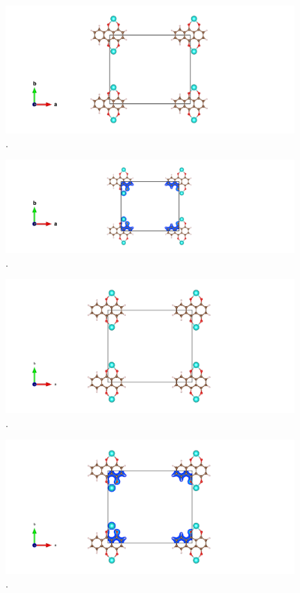 \documentclass{article}
\begin{document}
  \begin{figure}[H]
      \centering
      \includegraphics[width = 11cm]{../fig/Yb_relax_CONTCAR.png}
      \caption{. }
      \label{fig:Yb_relax_CONTCAR}
  \end{figure}

  \begin{figure}[H]
      \centering
      \includegraphics[width = 11cm]{../fig/Yb_relax_CHGCAR.png}
      \caption{. }
      \label{fig:Yb_relax_CHGCAR}
  \end{figure}

  \begin{figure}[H]
      \centering
      \includegraphics[width = 11cm]{../fig/Yb_staticafter_CONTCAR.png}
      \caption{. }
      \label{fig:Yb_staticafter_CONTCAR}
  \end{figure}

  \begin{figure}[H]
      \centering
      \includegraphics[width = 11cm]{../fig/Yb_staticafter_CHGCAR.png}
      \caption{. }
      \label{fig:Yb_staticafter_CHGCAR}
  \end{figure}
\end{document}
